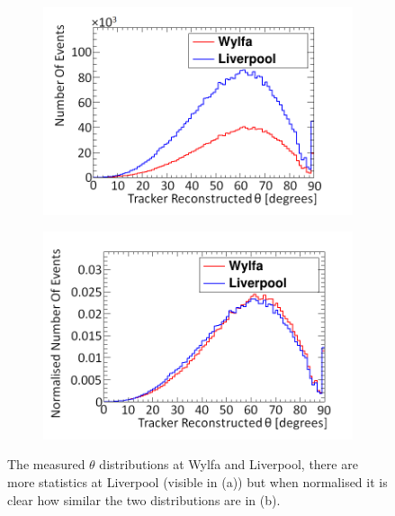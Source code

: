 \begin{figure}[!h]
\centering
\begin{subfigure}{.5\textwidth}
  \centering
  \includegraphics[width=\linewidth]{Chapter6/Figs/Raster/thetaWylfaLiverpoolNewMedText.png}
  \captionsetup{width=.9\linewidth}
  \caption{}
  \label{subFig:measuredThetaWylfaLiv}
\end{subfigure}%
\begin{subfigure}{.5\textwidth}
  \centering
\includegraphics[width=\linewidth]{Chapter6/Figs/Raster/thetaWylfaLiverpoolNewNormMedText.png}
  \captionsetup{width=.9\linewidth}
  \caption{}
  \label{subFig:measuredThetaWylfaLivNorm}
\end{subfigure}
\caption{The measured $\theta$ distributions at Wylfa and Liverpool, there are more statistics at Liverpool (visible in (a)) but when normalised it is clear how similar the two distributions are in (b).}
\label{fig:measuredThetaWylfaLiverpool}
\end{figure}

